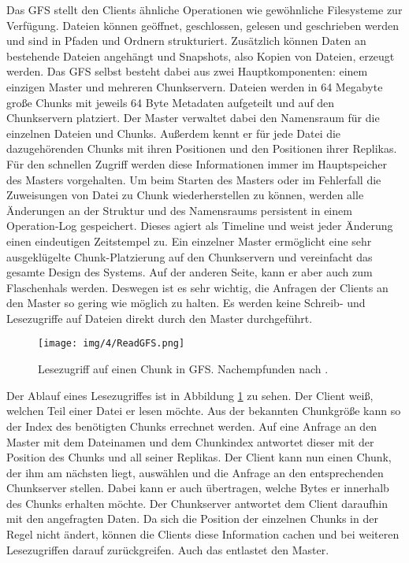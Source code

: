 \documentclass[12pt,oneside,a4paper,parskip]{scrbook}
\begin{document}
Das GFS stellt den Clients ähnliche Operationen wie gewöhnliche Filesysteme zur Ver\-fü\-gung. Dateien können geöffnet, geschlossen, gelesen und geschrieben werden und sind in Pfaden und Ordnern strukturiert. Zusätzlich können Daten an bestehende Dateien angehängt und Snapshots, also Kopien von Dateien, erzeugt werden. Das GFS selbst besteht dabei aus zwei Hauptkomponenten: einem einzigen Master und mehreren Chunkservern. Dateien werden in 64 Megabyte große Chunks mit jeweils 64 Byte Metadaten aufgeteilt und auf den Chunkservern platziert. Der Master verwaltet dabei den Namensraum für die einzelnen Dateien und Chunks. Außerdem kennt er für jede Datei die dazugehörenden Chunks mit ihren Positionen und den Positionen ihrer Replikas. Für den schnellen Zugriff werden diese Informationen immer im Hauptspeicher des Masters vorgehalten. Um beim Starten des Masters oder im Fehlerfall die Zuweisungen von Datei zu Chunk wiederherstellen zu können, werden alle Änderungen an der Struktur und des Namensraums persistent in einem Operation-Log gespeichert. Dieses agiert als Timeline und weist jeder Änderung einen eindeutigen Zeitstempel zu. Ein einzelner Master ermöglicht eine sehr ausgeklügelte Chunk-Platzierung auf den Chunkservern und vereinfacht das gesamte Design des Systems. Auf der anderen Seite, kann er aber auch zum Flaschenhals werden. Deswegen ist es sehr wichtig, die Anfragen der Clients an den Master so gering wie möglich zu halten. Es werden keine Schreib- und Lesezugriffe auf Dateien direkt durch den Master durchgeführt.

\begin{figure}[htb]
  \centering
  \texttt{[image: img/4/ReadGFS.png]}
  \caption[Lesezugriff auf einen Chunk in GFS]{Lesezugriff auf einen Chunk in GFS. Nachempfunden nach \cite{GFS}.}
  \label{readgfs}
\end{figure}

Der Ablauf eines Lesezugriffes ist in Abbildung \ref{readgfs} zu sehen. Der Client weiß, welchen Teil einer Datei er lesen möchte. Aus der bekannten Chunkgröße kann so der Index des benötigten Chunks errechnet werden. Auf eine Anfrage an den Master mit dem Dateinamen und dem Chunkindex antwortet dieser mit der Position des Chunks und all seiner Replikas. Der Client kann nun einen Chunk, der ihm am nächsten liegt, auswählen und die Anfrage an den entsprechenden Chunkserver stellen. Dabei kann er auch übertragen, welche Bytes er innerhalb des Chunks erhalten möchte. Der Chunkserver antwortet dem Client daraufhin mit den angefragten Daten. Da sich die Position der einzelnen Chunks in der Regel nicht ändert, können die Clients diese Information cachen und bei weiteren Lesezugriffen darauf zurückgreifen. Auch das entlastet den Master.
\end{document}
